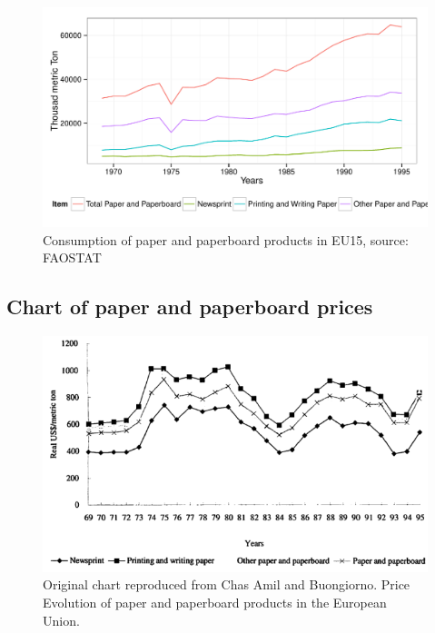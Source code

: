 \documentclass{scrartcl}\usepackage{graphicx, color}
\newenvironment{knitrout}{}{} %
\begin{document}
\begin{knitrout}
\color{fgcolor}\begin{figure}[h]


{\centering \includegraphics[width=.8\linewidth]{figure/ConsumptionEU15} 

}

\caption[Consumption of paper and paperboard products in EU15, source]{Consumption of paper and paperboard products in EU15, source: FAOSTAT\label{fig:ConsumptionEU15}}
\end{figure}


\end{knitrout}



\newpage
\subsection{Chart of paper and paperboard prices}
\begin{figure}[h]
\centering
\includegraphics[width=0.6\linewidth]{./figure/ChasAmilPriceEvolution}
\caption{Original chart reproduced from Chas Amil and Buongiorno. Price Evolution of paper and paperboard products in the European Union.}
\label{fig:ChasAmilPriceEvolution}
\end{figure}
\end{document}

